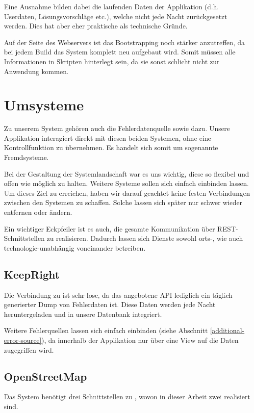 Eine Ausnahme bilden dabei die laufenden Daten der Applikation (d.h. Userdaten, Lösungsvorschläge etc.), welche nicht jede Nacht zurückgesetzt werden.
Dies hat aber eher praktische als technische Gründe.

Auf der Seite des Webservers ist das \gls{Bootstrapping} noch stärker anzutreffen, da bei jedem Build das System komplett neu aufgebaut wird.
Somit müssen alle Informationen in Skripten hinterlegt sein, da sie sonst schlicht nicht zur Anwendung kommen.

\section{Umsysteme}
Zu unserem System gehören auch die Fehlerdatenquelle  sowie  dazu.
Unsere Applikation interagiert direkt mit diesen beiden Systemen, ohne eine Kontrollfunktion zu übernehmen.
Es handelt sich somit um sogenannte Fremdsysteme.

Bei der Gestaltung der Systemlandschaft war es uns wichtig, diese so flexibel und offen wie möglich zu halten.
Weitere Systeme sollen sich einfach einbinden lassen.
Um dieses Ziel zu erreichen, haben wir darauf geachtet keine festen Verbindungen zwischen den Systemen zu schaffen.
Solche lassen sich später nur schwer wieder entfernen oder ändern.

Ein wichtiger Eckpfeiler ist es auch, die gesamte Kommunikation über \gls{REST}-Schnittstellen zu realisieren.
Dadurch lassen sich Dienste sowohl orts-, wie auch technologie-unabhängig voneinander betreiben.

\subsection{KeepRight}
Die Verbindung zu  ist sehr lose, da das angebotene \gls{API} lediglich ein täglich generierter Dump von Fehlerdaten ist.
Diese Daten werden jede Nacht heruntergeladen und in unsere Datenbank integriert.

Weitere Fehlerquellen lassen sich einfach einbinden (siehe Abschnitt \ref{additional-error-source}), da innerhalb der Applikation nur über eine View auf die Daten zugegriffen wird.

\subsection{OpenStreetMap}
Das System benötigt drei Schnittstellen zu , wovon in dieser Arbeit zwei realisiert sind.

